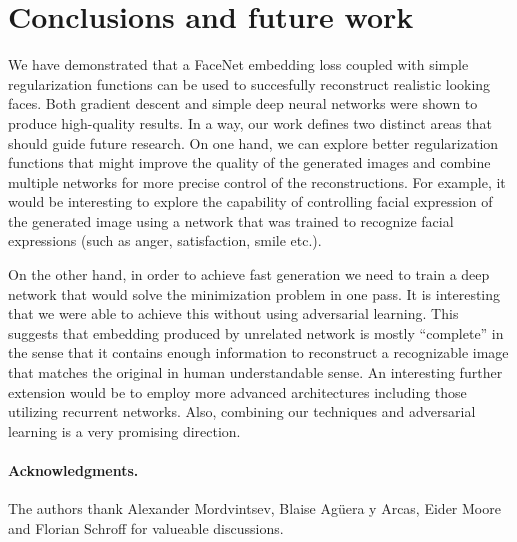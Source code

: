\documentclass{article}
\begin{document}
\section{Conclusions and future work}

  We have demonstrated that a FaceNet embedding loss coupled with simple regularization functions can be used to succesfully reconstruct realistic looking faces.
  Both gradient descent and simple deep neural networks were shown to produce high-quality results.
  In a way, our work defines two distinct areas that should guide future
  research.
  On one hand, we can explore better regularization functions that might improve the quality of the generated images
  and combine multiple networks for more precise control of the reconstructions.
  For example, it would be interesting to explore the capability of controlling facial expression of the generated image using a network that was
  trained to recognize facial expressions (such as anger, satisfaction, smile etc.).

  On the other hand, in order to achieve fast generation we need to train a deep network that would solve the minimization problem in
  one pass.
  It is interesting that we were able to achieve this without using adversarial learning.
  This suggests that embedding produced by unrelated network is mostly ``complete'' in the sense
  that it contains enough information to reconstruct a recognizable image that matches the original in human understandable sense. An interesting further extension would be to employ more advanced architectures
  including those utilizing recurrent networks. Also, combining our techniques and adversarial learning is a very promising direction.

\paragraph{Acknowledgments.}
  The authors thank Alexander Mordvintsev, Blaise Ag\"uera y Arcas, Eider Moore and Florian Schroff for valueable discussions.

\small




\normalsize
\end{document}
